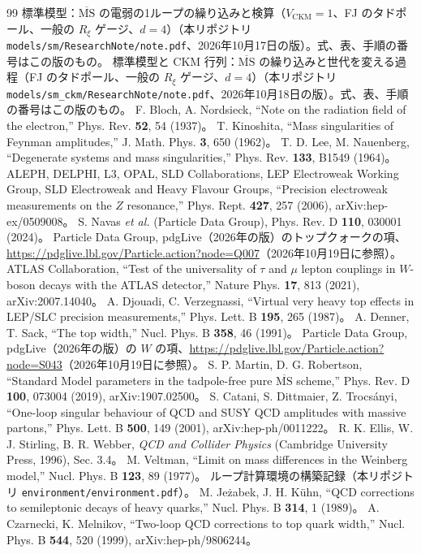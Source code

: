 \documentclass[a4paper,10pt]{ltjsarticle}
\newcommand{\MSbar}{\overline{\mathrm{MS}}}
\begin{document}
\begin{thebibliography}{99}
 標準模型：$\MSbar$ の電弱の1ループの繰り込みと検算（$V_{\mathrm{CKM}}=1$、FJ のタドポール、一般の $R_\xi$ ゲージ、$d=4$）（本リポジトリ \nolinkurl{models/sm/ResearchNote/note.pdf}、2026年10月17日の版）。式、表、手順の番号はこの版のもの。
 標準模型と CKM 行列：$\MSbar$ の繰り込みと世代を変える過程（FJ のタドポール、一般の $R_\xi$ ゲージ、$d=4$）（本リポジトリ \nolinkurl{models/sm_ckm/ResearchNote/note.pdf}、2026年10月18日の版）。式、表、手順の番号はこの版のもの。
 F. Bloch, A. Nordsieck, ``Note on the radiation field of the electron,'' Phys. Rev. \textbf{52}, 54 (1937)。
 T. Kinoshita, ``Mass singularities of Feynman amplitudes,'' J. Math. Phys. \textbf{3}, 650 (1962)。
 T. D. Lee, M. Nauenberg, ``Degenerate systems and mass singularities,'' Phys. Rev. \textbf{133}, B1549 (1964)。
 ALEPH, DELPHI, L3, OPAL, SLD Collaborations, LEP Electroweak Working Group, SLD Electroweak and Heavy Flavour Groups, ``Precision electroweak measurements on the $Z$ resonance,'' Phys. Rept. \textbf{427}, 257 (2006), arXiv:hep-ex/0509008。
 S. Navas \textit{et al.} (Particle Data Group), Phys. Rev. D \textbf{110}, 030001 (2024)。
 Particle Data Group, pdgLive（2026年の版）のトップクォークの項、\url{https://pdglive.lbl.gov/Particle.action?node=Q007}（2026年10月19日に参照）。
 ATLAS Collaboration, ``Test of the universality of $\tau$ and $\mu$ lepton couplings in $W$-boson decays with the ATLAS detector,'' Nature Phys. \textbf{17}, 813 (2021), arXiv:2007.14040。
 A. Djouadi, C. Verzegnassi, ``Virtual very heavy top effects in LEP/SLC precision measurements,'' Phys. Lett. B \textbf{195}, 265 (1987)。
 A. Denner, T. Sack, ``The top width,'' Nucl. Phys. B \textbf{358}, 46 (1991)。
 Particle Data Group, pdgLive（2026年の版）の $W$ の項、\url{https://pdglive.lbl.gov/Particle.action?node=S043}（2026年10月19日に参照）。
 S. P. Martin, D. G. Robertson, ``Standard Model parameters in the tadpole-free pure $\overline{\mathrm{MS}}$ scheme,'' Phys. Rev. D \textbf{100}, 073004 (2019), arXiv:1907.02500。
 S. Catani, S. Dittmaier, Z. Trocs\'anyi, ``One-loop singular behaviour of QCD and SUSY QCD amplitudes with massive partons,'' Phys. Lett. B \textbf{500}, 149 (2001), arXiv:hep-ph/0011222。
 R. K. Ellis, W. J. Stirling, B. R. Webber, \textit{QCD and Collider Physics} (Cambridge University Press, 1996), Sec. 3.4。
 M. Veltman, ``Limit on mass differences in the Weinberg model,'' Nucl. Phys. B \textbf{123}, 89 (1977)。
 ループ計算環境の構築記録（本リポジトリ \nolinkurl{environment/environment.pdf}）。
 M. Je\.zabek, J. H. K\"uhn, ``QCD corrections to semileptonic decays of heavy quarks,'' Nucl. Phys. B \textbf{314}, 1 (1989)。
 A. Czarnecki, K. Melnikov, ``Two-loop QCD corrections to top quark width,'' Nucl. Phys. B \textbf{544}, 520 (1999), arXiv:hep-ph/9806244。
\end{thebibliography}
\end{document}
